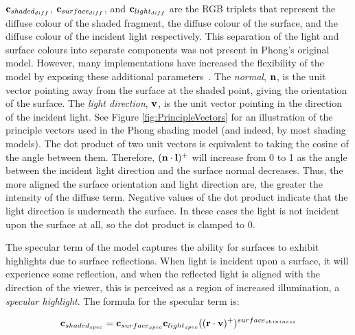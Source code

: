 \begin{math}\mathbf{c}_{shaded_{diff}}\end{math}, \begin{math}\mathbf{c}_{surface_{diff}}\end{math}, and \begin{math}\mathbf{c}_{light_{diff}}\end{math} are the RGB triplets that represent the diffuse colour of the shaded fragment, the diffuse colour of the surface, and the diffuse colour of the incident light respectively. This separation of the light and surface colours into separate components was not present in Phong's original model. However, many implementations have increased the flexibility of the model by exposing these additional parameters~\cite{LightingModelForComputerAnimators}. The \textit{normal}, \begin{math}\mathbf{n}\end{math}, is the unit vector pointing away from the surface at the shaded point, giving the orientation of the surface.  The \textit{light direction}, \begin{math}\mathbf{v}\end{math}, is the unit vector pointing in the direction of the incident light. See Figure \ref{fig:PrincipleVectors} for an illustration of the principle vectors used in the Phong shading model (and indeed, by most shading models). The dot product of two unit vectors is equivalent to taking the cosine of the angle between them. Therefore, \begin{math}(\mathbf{n}\cdot\mathbf{l})^+\end{math} will increase from 0 to 1 as the angle between the incident light direction and the surface normal decreases. Thus, the more aligned the surface orientation and light direction are, the greater the intensity of the diffuse term. Negative values of the dot product indicate that the light direction is underneath the surface. In these cases the light is not incident upon the surface at all, so the dot product is clamped to 0.

The specular term of the model captures the ability for surfaces to exhibit highlights due to surface reflections. When light is incident upon a surface, it will experience some reflection, and when the reflected light is aligned with the direction of the viewer, this is perceived as a region of increased illumination, a \textit{specular highlight}. The formula for the specular term is:

\begin{equation}
	\mathbf{c}_{shaded_{spec}} = \mathbf{c}_{surface_{spec}}\mathbf{c}_{light_{spec}}((\mathbf{r}\cdot\mathbf{v})^+)^{surface_{shininess}}
\end{equation}

